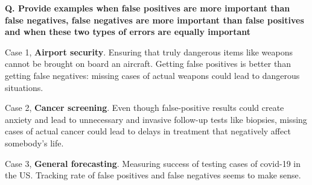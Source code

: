 \begin{frame}[fragile]{\textbf{Q. Provide examples when false positives are more
      important than false negatives, false negatives are more important than
      false positives and when these two types of errors are equally important}}
  \begin{wideitemize}
    \item Case 1, \textbf{Airport security}. Ensuring that truly dangerous items like
    weapons cannot be brought on board an aircraft. Getting false positives is better than
    getting false negatives: missing cases of actual weapons could lead to dangerous situations.
  \item Case 2, \textbf{Cancer screening}. Even though false-positive results could create
  anxiety and lead to unnecessary and invasive follow-up tests like biopsies, missing cases of
  actual cancer could lead to delays in treatment that negatively affect somebody's life.
  \item Case 3, \textbf{General forecasting}. Measuring success of testing cases
  of covid-19 in the US. Tracking rate of false positives and false negatives seems to make sense.
  \end{wideitemize}
\end{frame}

